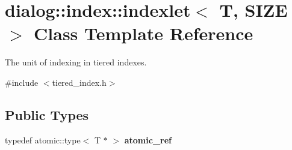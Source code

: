 \hypertarget{classdialog_1_1index_1_1indexlet}{}\section{dialog\+:\+:index\+:\+:indexlet$<$ T, S\+I\+ZE $>$ Class Template Reference}
\label{classdialog_1_1index_1_1indexlet}


The unit of indexing in tiered indexes.  




{\ttfamily \#include $<$tiered\+\_\+index.\+h$>$}

\subsection*{Public Types}
\begin{DoxyCompactItemize}
\item 
\mbox{\label{classdialog_1_1index_1_1indexlet_ae0261936539a2e33e07319981977dda3}} 
typedef atomic\+::type$<$ T $\ast$ $>$ {\bfseries atomic\+\_\+ref}
\end{DoxyCompactItemize}
